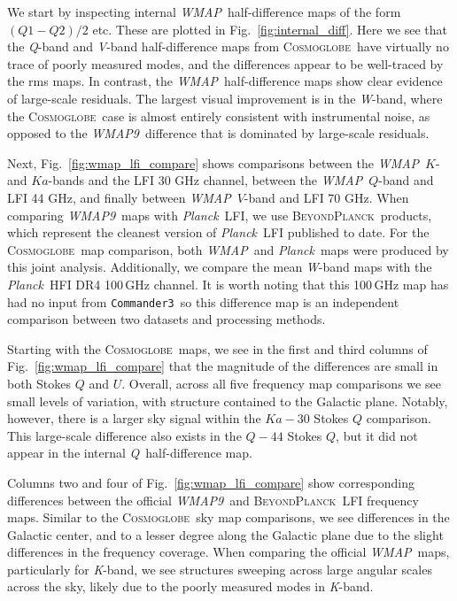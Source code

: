 \documentclass[twocolumn]{../../common/aa}
\def\WMAP{\emph{WMAP}}
\def\WMAPnine{\emph{WMAP9}}
\def\Planck{\emph{Planck}}
\def\commanderthree{\texttt{Commander3}}
\newcommand{\BP}{\textsc{BeyondPlanck}}
\newcommand{\cosmoglobe}{\textsc{Cosmoglobe}}
\newcommand{\K}[0]{\textit K}
\newcommand{\Ka}[0]{\textit{Ka}}
\newcommand{\Q}[0]{\textit Q}
\newcommand{\V}[0]{\textit V}
\newcommand{\W}[0]{\textit W}
\begin{document}
We start by inspecting internal \WMAP\ half-difference maps of the form $(Q1-Q2)/2$ etc. These are plotted in Fig.~\ref{fig:internal_diff}. Here we see that the \Q-band and \V-band half-difference maps from \cosmoglobe\ have virtually no trace of poorly measured modes, and the differences appear to be well-traced by the rms maps. In contrast, the \WMAP\ half-difference maps show clear evidence of large-scale residuals. The largest visual improvement is in the \W-band, where the \cosmoglobe\ case is almost entirely consistent with instrumental noise, as opposed to the \WMAPnine\ difference that is dominated by large-scale residuals.  

Next, Fig.~\ref{fig:wmap_lfi_compare} shows comparisons between the \WMAP\ $K$-
and $Ka$-bands and the LFI 30 GHz channel, between the \WMAP\ $Q$-band and LFI
44 GHz, and finally between \WMAP\ $V$-band and LFI 70 GHz. When comparing
\WMAPnine\ maps with \Planck\ LFI, we use \BP\ products, which represent the
cleanest version of \Planck\ LFI published to date. For the \cosmoglobe\ map
comparison, both \WMAP\ and \Planck\ maps were produced by this joint analysis.
Additionally, we compare the mean \W-band maps with the \Planck\ HFI DR4
100\,GHz channel. It is worth noting that this 100\,GHz map has had no input
from \commanderthree\ so this difference map is an independent comparison
between two datasets and processing methods.

Starting with the \cosmoglobe\ maps, we see in the first and third columns of
Fig.~\ref{fig:wmap_lfi_compare} that the magnitude of the differences are small
in both Stokes $Q$ and $U$. Overall, across all five frequency map comparisons
we see small levels of variation, with structure contained to the Galactic
plane. Notably, however, there is a larger sky signal within the
$\mathit{Ka}-30$ Stokes $Q$ comparison.
This large-scale difference also exists in the $\mathit Q-44$ Stokes
$Q$, but it did not appear in the internal \Q\ half-difference map.

Columns two and four of Fig.~\ref{fig:wmap_lfi_compare} show corresponding differences
between the official \WMAPnine\ and \BP\ LFI frequency maps. Similar to the
\cosmoglobe\ sky map comparisons, we see differences in the Galactic center,
and to a lesser degree along the Galactic plane due to the slight differences
in the frequency coverage. When comparing the official \WMAP\ maps,
particularly for \K-band, we see structures sweeping across large angular
scales across the sky, likely due to the poorly measured modes in \K-band. 
\end{document}
